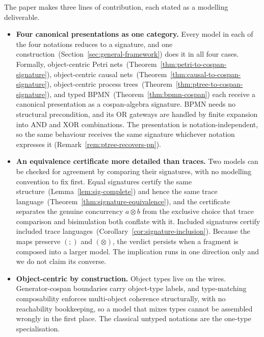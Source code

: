 The paper makes three lines of contribution, each stated as a modelling deliverable.

\begin{itemize}

  \item \textbf{Four canonical presentations as one category.} Every model in each of the four
    notations reduces to a signature, and one construction~(Section~\ref{sec:general-framework})
    does it in all four cases. Formally,
    object-centric Petri nets~(Theorem~\ref{thm:petri-to-cospan-signature}), object-centric causal
    nets~(Theorem~\ref{thm:causal-to-cospan-signature}), object-centric process
    trees~(Theorem~\ref{thm:ptree-to-cospan-signature}), and typed
    BPMN~(Theorem~\ref{thm:bpmn-cospan}) each receive a canonical presentation as a cospan-algebra
    signature. BPMN needs no structural precondition, and its OR
    gateways are handled by finite expansion into AND and XOR combinations. The presentation is
    notation-independent, so the same behaviour receives the same signature whichever notation
    expresses it (Remark~\ref{rem:ptree-recovers-pn}).

  \item \textbf{An equivalence certificate more detailed than traces.} Two models can be checked for
    agreement by comparing their signatures, with no modelling convention to fix first. Equal
    signatures certify the same structure~(Lemma~\ref{lem:sig-complete}) and hence the same trace
    language~(Theorem~\ref{thm:signature-equivalence}), and the certificate separates the genuine
    concurrency $a\otimes b$ from the exclusive choice that trace comparison and bisimulation both
    conflate with it. Included signatures certify included trace
    languages~(Corollary~\ref{cor:signature-inclusion}).
    Because the maps preserve $(;)$ and $(\otimes)$, the verdict persists when a fragment is
    composed into a larger model. The implication runs in one direction only and we do not claim its
    converse.

  \item \textbf{Object-centric by construction.} Object types live on the wires. Generator-cospan
    boundaries carry object-type labels, and type-matching composability enforces multi-object
    coherence structurally, with no reachability bookkeeping, so a model that mixes types cannot be
    assembled wrongly in the first place. The classical untyped notations are the one-type
    specialisation.

\end{itemize}

